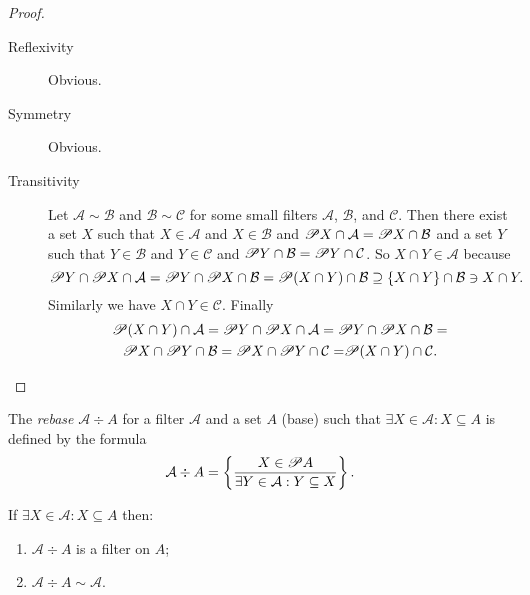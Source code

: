 \begin{proof}
~
\begin{description}
\item [{Reflexivity}] Obvious.
\item [{Symmetry}] Obvious.
\item [{Transitivity}] Let $\mathcal{A}\sim\mathcal{B}$ and $\mathcal{B}\sim\mathcal{C}$
for some small filters $\mathcal{A}$, $\mathcal{B}$, and $\mathcal{C}$.
Then there exist a set $X$ such that $X\in\mathcal{A}$ and $X\in\mathcal{B}$
and $\mathscr{P} X\cap\mathcal{A}=\mathscr{P} X\cap\mathcal{B}$ and a set
$Y$ such that $Y\in\mathcal{B}$ and $Y\in\mathcal{C}$ and $\mathscr{P} Y\cap\mathcal{B}=\mathscr{P} Y\cap\mathcal{C}$.
So $X\cap Y\in\mathcal{A}$ because
\[
\mathscr{P} Y\cap\mathscr{P} X\cap\mathcal{A}=\mathscr{P} Y\cap\mathscr{P} X\cap\mathcal{B}=\mathscr{P}(X\cap Y)\cap\mathcal{B}\supseteq\{X\cap Y\}\cap\mathcal{B}\ni X\cap Y.
\]
Similarly we have $X\cap Y\in\mathcal{C}$. Finally
\begin{multline*}
\mathscr{P}(X\cap Y)\cap\mathcal{A}=\mathscr{P} Y\cap\mathscr{P} X\cap\mathcal{A}=\mathscr{P} Y\cap\mathscr{P} X\cap\mathcal{B}=\\
\mathscr{P} X\cap\mathscr{P} Y\cap\mathcal{B}=\mathscr{P} X\cap\mathscr{P} Y\cap\mathcal{C=}\mathscr{P}(X\cap Y)\cap\mathcal{C}.
\end{multline*}

\end{description}
\end{proof}
\begin{defn}
The \emph{rebase} $\mathcal{A}\div A$ for a
filter $\mathcal{A}$ and a set $A$ (base) such that $\exists X\in\mathcal{A}:X\subseteq A$
is defined by the formula
\[
\mathcal{A}\div A=\left\{ \frac{X\in\mathscr{P} A}{\exists Y\in\mathcal{A}:Y\subseteq X}\right\}.
\]
\end{defn}
\begin{prop}
If $\exists X\in\mathcal{A}:X\subseteq A$ then:
\begin{enumerate}
\item \label{div-filt}$\mathcal{A}\div A$ is a filter on $A$;
\item \label{div-eq}$\mathcal{A}\div A\sim\mathcal{A}$.
\end{enumerate}
\end{prop}

